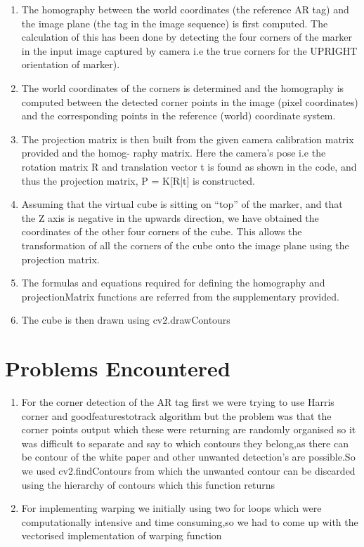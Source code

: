 \documentclass{article}
\begin{document}
\begin{enumerate}
    \item The homography between the world coordinates (the reference AR tag) and the image plane (the tag in the image sequence) is first computed. The calculation of this has been done by detecting the four corners of the marker in the input image captured by camera i.e the true corners for the UPRIGHT orientation of marker).
    \item The world coordinates of the corners is determined and the homography is computed between the detected corner points in the image (pixel coordinates) and the corresponding points in the reference (world) coordinate system.
    \item The projection matrix is then built from the given camera calibration matrix provided and the homog- raphy matrix. Here the camera’s pose i.e the rotation matrix R and translation vector t is found as shown in the code, and thus the projection matrix, P = K[R|t] is constructed.
    \item Assuming that the virtual cube is sitting on “top” of the marker, and that the Z axis is negative in the upwards direction, we have obtained the coordinates of the other four corners of the cube. This allows the transformation of all the corners of the cube onto the image plane using the projection matrix.
    \item The formulas and equations required for defining the homography and projectionMatrix functions are
referred from the supplementary provided.
    \item The cube is then drawn using cv2.drawContours
\end{enumerate}
\section{Problems Encountered}
\begin{enumerate}
    \item For the corner detection of the AR tag first we were trying to use Harris corner and goodfeaturestotrack algorithm but the problem was that the corner points output which these were returning are randomly organised so it was difficult to separate and say to which contours they belong,as there can be contour of the white paper and other unwanted detection's are possible.So we used cv2.findContours from which the unwanted contour can be discarded using the hierarchy of contours which this function returns
    
    \item For implementing warping we initially using two for loops which were computationally intensive and time consuming,so we had to come up with the vectorised implementation of warping function
 
\end{enumerate}
\end{document}
